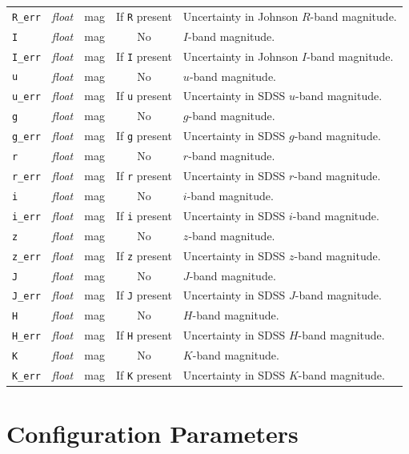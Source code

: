 \documentclass{report}
\begin{document}
\begin{center}
\begin{longtable}{lllcp{2in}}
\verb|R_err| & {\it float} & mag & If \verb|R| present & Uncertainty in Johnson $R$-band magnitude. \\
\verb|I| & {\it float} & mag & No & $I$-band magnitude. \\
\verb|I_err| & {\it float} & mag & If \verb|I| present & Uncertainty in Johnson $I$-band magnitude. \\
\verb|u| & {\it float} & mag & No & $u$-band magnitude. \\
\verb|u_err| & {\it float} & mag & If \verb|u| present & Uncertainty in SDSS $u$-band magnitude. \\
\verb|g| & {\it float} & mag & No & $g$-band magnitude. \\
\verb|g_err| & {\it float} & mag & If \verb|g| present & Uncertainty in SDSS $g$-band magnitude. \\
\verb|r| & {\it float} & mag & No & $r$-band magnitude. \\
\verb|r_err| & {\it float} & mag & If \verb|r| present & Uncertainty in SDSS $r$-band magnitude. \\
\verb|i| & {\it float} & mag & No & $i$-band magnitude. \\
\verb|i_err| & {\it float} & mag & If \verb|i| present & Uncertainty in SDSS $i$-band magnitude. \\
\verb|z| & {\it float} & mag & No & $z$-band magnitude. \\
\verb|z_err| & {\it float} & mag & If \verb|z| present & Uncertainty in SDSS $z$-band magnitude. \\
\verb|J| & {\it float} & mag & No & $J$-band magnitude. \\
\verb|J_err| & {\it float} & mag & If \verb|J| present & Uncertainty in SDSS $J$-band magnitude. \\
\verb|H| & {\it float} & mag & No & $H$-band magnitude. \\
\verb|H_err| & {\it float} & mag & If \verb|H| present & Uncertainty in SDSS $H$-band magnitude. \\
\verb|K| & {\it float} & mag & No & $K$-band magnitude. \\
\verb|K_err| & {\it float} & mag & If \verb|K| present & Uncertainty in SDSS $K$-band magnitude. \\
\end{longtable}
\end{center}


\chapter{Configuration Parameters}
\end{document}

